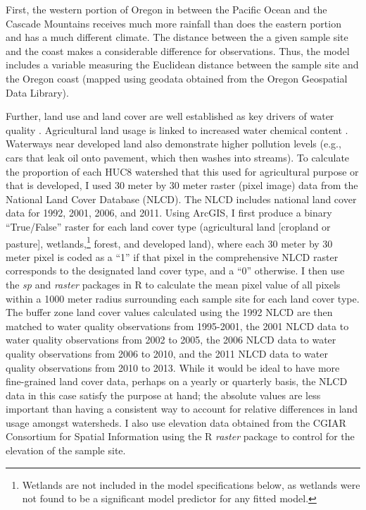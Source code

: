 \documentclass[11pt,a4paper,titlepage]{article}
\begin{document}
First, the western portion of Oregon in between the Pacific Ocean and the Cascade Mountains receives much more rainfall than does the eastern portion and has a much different climate. The distance between the a given sample site and the coast makes a considerable difference for observations. Thus, the model includes a variable measuring the Euclidean distance between the sample site and the Oregon coast (mapped using geodata obtained from the Oregon Geospatial Data Library). 

Further, land use and land cover are well established as key drivers of water quality \parencite{tong2002,meador2003}. Agricultural land usage is linked to increased water chemical content \parencite{skaggs1994,johnes1997}. Waterways near developed land also demonstrate higher pollution levels \parencite{wang2001} (e.g., cars that leak oil onto pavement, which then washes into streams). To calculate the proportion of each HUC8 watershed that this used for agricultural purpose or that is developed, I used 30 meter by 30 meter raster (pixel image) data from the National Land Cover Database (NLCD). The NLCD includes national land cover data for 1992, 2001, 2006, and 2011. Using ArcGIS, I first produce a binary “True/False” raster for each land cover type (agricultural land [cropland or pasture], wetlands,\footnote{Wetlands are not included in the model specifications below, as wetlands were not found to be a significant model predictor for any fitted model.} forest, and developed land), where each 30 meter by 30 meter pixel is coded as a “1” if that pixel in the comprehensive NLCD raster corresponds to the designated land cover type, and a “0” otherwise. I then use the \textit{sp} \parencite{pebesma2014} and \textit{raster} \parencite{hijmans2014} packages in R to calculate the mean pixel value of all pixels within a 1000 meter radius surrounding each sample site for each land cover type. The buffer zone land cover values calculated using the 1992 NLCD are then matched to water quality observations from 1995-2001, the 2001 NLCD data to water quality observations from 2002 to 2005, the 2006 NLCD data to water quality observations from 2006 to 2010, and the 2011 NLCD data to water quality observations from 2010 to 2013. While it would be ideal to have more fine-grained land cover data, perhaps on a yearly or quarterly basis, the NLCD data in this case satisfy the purpose at hand; the absolute values are less important than having a consistent way to account for relative differences in land usage amongst watersheds. I also use elevation data obtained from the CGIAR Consortium for Spatial Information using the R \textit{raster} package \parencite{hijmans2014} to control for the elevation of the sample site.  
\end{document}
